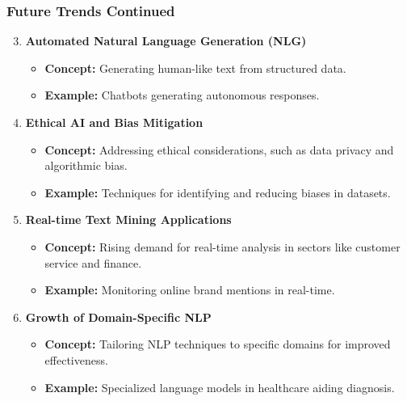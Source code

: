 \documentclass[aspectratio=169]{beamer}
\begin{document}
\begin{frame}[fragile]
  \frametitle{Future Trends Continued}
  \begin{enumerate}
    \setcounter{enumi}{2} %
    \item \textbf{Automated Natural Language Generation (NLG)}
      \begin{itemize}
        \item \textbf{Concept:} Generating human-like text from structured data.
        \item \textbf{Example:} Chatbots generating autonomous responses.
      \end{itemize}

    \item \textbf{Ethical AI and Bias Mitigation}
      \begin{itemize}
        \item \textbf{Concept:} Addressing ethical considerations, such as data privacy and algorithmic bias.
        \item \textbf{Example:} Techniques for identifying and reducing biases in datasets.
      \end{itemize}

    \item \textbf{Real-time Text Mining Applications}
      \begin{itemize}
        \item \textbf{Concept:} Rising demand for real-time analysis in sectors like customer service and finance.
        \item \textbf{Example:} Monitoring online brand mentions in real-time.
      \end{itemize}

    \item \textbf{Growth of Domain-Specific NLP}
      \begin{itemize}
        \item \textbf{Concept:} Tailoring NLP techniques to specific domains for improved effectiveness.
        \item \textbf{Example:} Specialized language models in healthcare aiding diagnosis.
      \end{itemize}
  \end{enumerate}
\end{frame}
\end{document}
